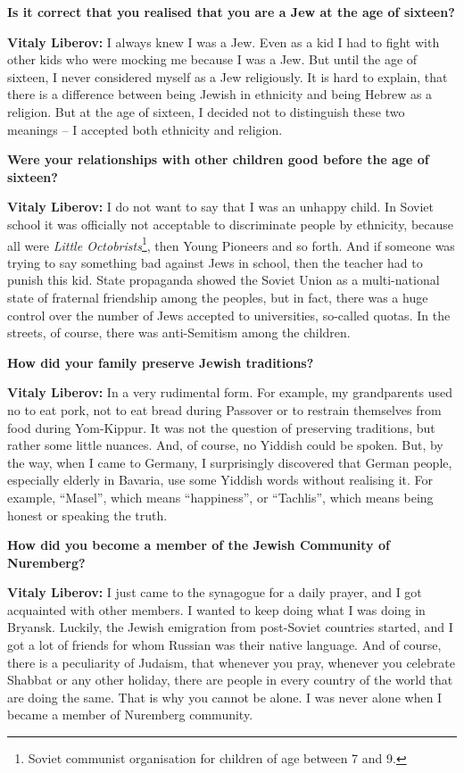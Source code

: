 \textbf{Is it correct that you realised that you are a Jew at the age of sixteen?} 

\textbf{Vitaly Liberov:} I always knew I was a Jew. Even as a kid I had to fight with other kids who were mocking me because I was a Jew. But until the age of sixteen, I never considered myself as a Jew religiously. It is hard to explain, that there is a difference between being Jewish in ethnicity and being Hebrew as a religion. But at the age of sixteen, I decided not to distinguish these two meanings – I accepted both ethnicity and religion.  

\textbf{Were your relationships with other children good before the age of sixteen?} 

\textbf{Vitaly Liberov:} I do not want to say that I was an unhappy child. In Soviet school it was officially not acceptable to discriminate people by ethnicity, because all were \textit{Little Octobrists}\footnote{Soviet communist organisation for children of age between 7 and 9.}, then Young Pioneers and so forth. And if someone was trying to say something bad against Jews in school, then the teacher had to punish this kid. State propaganda showed the Soviet Union as a multi-national state of fraternal friendship among the peoples, but in fact, there was a huge control over the number of Jews accepted to universities, so-called quotas. In the streets, of course, there was anti-Semitism among the children.  

\textbf{How did your family preserve Jewish traditions?} 

\textbf{Vitaly Liberov:} In a very rudimental form. For example, my grandparents used no to eat pork, not to eat bread during Passover or to restrain themselves from food during Yom-Kippur. It was not the question of preserving traditions, but rather some little nuances. And, of course, no Yiddish could be spoken. But, by the way, when I came to Germany, I surprisingly discovered that German people, especially elderly in Bavaria, use some Yiddish words without realising it. For example, ``Masel'', which means ``happiness'', or ``Tachlis'', which means being honest or speaking the truth.  

\textbf{How did you become a member of the Jewish Community of Nuremberg?} 

\textbf{Vitaly Liberov:} I just came to the synagogue for a daily prayer, and I got acquainted with other members. I wanted to keep doing what I was doing in Bryansk. Luckily, the Jewish emigration from post-Soviet countries started, and I got a lot of friends for whom Russian was their native language. And of course, there is a peculiarity of Judaism, that whenever you pray, whenever you celebrate Shabbat or any other holiday, there are people in every country of the world that are doing the same. That is why you cannot be alone. I was never alone when I became a member of Nuremberg community.  

